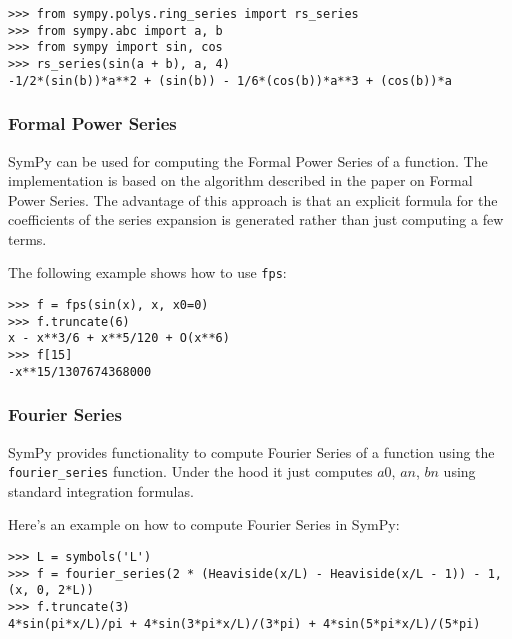 \begin{verbatim}
>>> from sympy.polys.ring_series import rs_series
>>> from sympy.abc import a, b
>>> from sympy import sin, cos
>>> rs_series(sin(a + b), a, 4)
-1/2*(sin(b))*a**2 + (sin(b)) - 1/6*(cos(b))*a**3 + (cos(b))*a
\end{verbatim}

\subsubsection{Formal Power Series}

SymPy can be used for computing the Formal Power Series\cite{wiki:formal} of a function.
The implementation is based on the algorithm described in the paper on
Formal Power Series\cite{Gruntz93formalpower}.  The advantage of this approach is
that an explicit formula for the coefficients of the series expansion is generated
rather than just computing a few terms.

The following example shows how to use \texttt{fps}:

\begin{verbatim}
>>> f = fps(sin(x), x, x0=0)
>>> f.truncate(6)
x - x**3/6 + x**5/120 + O(x**6)
>>> f[15]
-x**15/1307674368000
\end{verbatim}

\subsubsection{Fourier Series}

SymPy provides functionality to compute Fourier Series\cite{wiki:fourier} of a function using
the \texttt{fourier\_series} function. Under the hood it just computes $a0$, $an$, $bn$ using
standard integration formulas.

Here's an example on how to compute Fourier Series in SymPy:

\begin{verbatim}
>>> L = symbols('L')
>>> f = fourier_series(2 * (Heaviside(x/L) - Heaviside(x/L - 1)) - 1, (x, 0, 2*L))
>>> f.truncate(3)
4*sin(pi*x/L)/pi + 4*sin(3*pi*x/L)/(3*pi) + 4*sin(5*pi*x/L)/(5*pi)
\end{verbatim}
